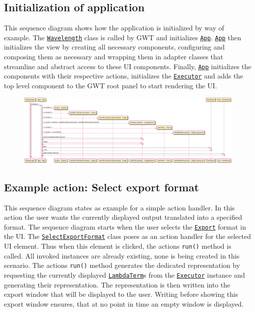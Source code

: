 \subsection{Initialization of application}
This sequence diagram shows how the application is initialized by way of example. The \texttt{\hyperref[type:edu.kit.wavelength.client.client.Wavelength]{Wavelength}} class is called by GWT and initializes \texttt{\hyperref[type:edu.kit.wavelength.client.view.App]{App}}. 
\texttt{\hyperref[type:edu.kit.wavelength.client.view.App]{App}} then initializes the view by creating all necessary components, configuring and composing them as necessary and wrapping them in adapter classes that streamline and abstract access to these UI components.
Finally, \texttt{\hyperref[type:edu.kit.wavelength.client.view.App]{App}} initializes the components with their respective actions, initializes the \texttt{\hyperref[type:edu.kit.wavelength.client.view.execution.Executor]{Executor}} and adds the top level component to the GWT root panel to start rendering the UI.

\begin{figure}[H]
	\centering
	\includegraphics[width=\textwidth]{sequenceDiagrams/initialization.png}
\end{figure}

\subsection{Example action: Select export format}
This sequence diagram states as example for a simple action handler.
In this action the user wants the currently displayed output translated into a specified format. The sequence diagram starts when the user selects the \texttt{\hyperref[type:edu.kit.wavelength.client.view.export.Export]{Export}} format in the UI. 
The \texttt{\hyperref[type:edu.kit.wavelength.client.view.action.SelectExportFormat]{SelectExportFormat}} class poses as an action handler for the selected UI element. Thus when this element is clicked, the actions \texttt{run()} method is called. All invoked instances are already existing, none is being created in this scenario.
The actions \texttt{run()} method generates the dedicated representation by requesting the currently displayed \texttt{\hyperref[type:edu.kit.wavelength.client.model.term.LambdaTerm]{LambdaTerm}}s from the \texttt{\hyperref[type:edu.kit.wavelength.client.view.execution.Executor]{Executor}} instance and generating their representation.
The representation is then written into the export window that will be displayed to the user. Writing before showing this export window ensures, that at no point in time an empty window is displayed.


